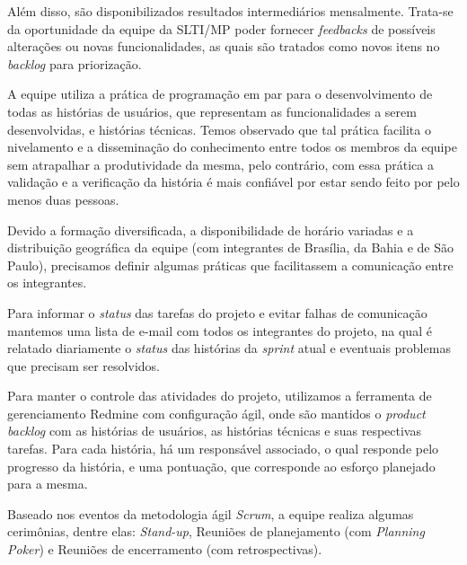 Além disso, são disponibilizados resultados intermediários mensalmente. Trata-se da oportunidade da equipe da SLTI/MP poder fornecer \textit{feedbacks} de possíveis alterações ou novas funcionalidades, as quais são tratados como novos itens no \textit{backlog} para priorização.


A equipe utiliza a prática de programação em par para o desenvolvimento de todas as histórias de usuários, que representam as funcionalidades a serem desenvolvidas, e histórias técnicas. Temos observado que tal prática facilita o nivelamento e a disseminação do conhecimento entre todos os membros da equipe sem atrapalhar a produtividade da mesma, pelo contrário, com essa prática a validação e a verificação da história é mais confiável por estar sendo feito por pelo menos duas pessoas.


Devido a formação diversificada, a disponibilidade de horário variadas e a distribuição geográfica da equipe (com integrantes de Brasília, da Bahia e de São Paulo), precisamos definir algumas práticas que facilitassem a comunicação entre os integrantes. 

Para informar o \textit{status} das tarefas do projeto e evitar falhas de comunicação mantemos uma lista de e-mail com todos os integrantes do projeto, na qual é relatado diariamente o \textit{status} das histórias da \textit{sprint} atual e eventuais problemas que precisam ser resolvidos. 

Para manter o controle das atividades do projeto, utilizamos a ferramenta de gerenciamento Redmine com configuração ágil, onde são mantidos o \textit{product backlog} com as histórias de usuários, as histórias técnicas e suas respectivas tarefas. Para cada história, há um responsável associado, o qual responde pelo progresso da história, e uma pontuação, que corresponde ao esforço planejado para a mesma.


Baseado nos eventos da metodologia ágil \textit{Scrum}, a equipe realiza algumas cerimônias, dentre elas: \textit{Stand-up}, Reuniões de planejamento (com \textit{Planning Poker}) e Reuniões de encerramento (com retrospectivas).



